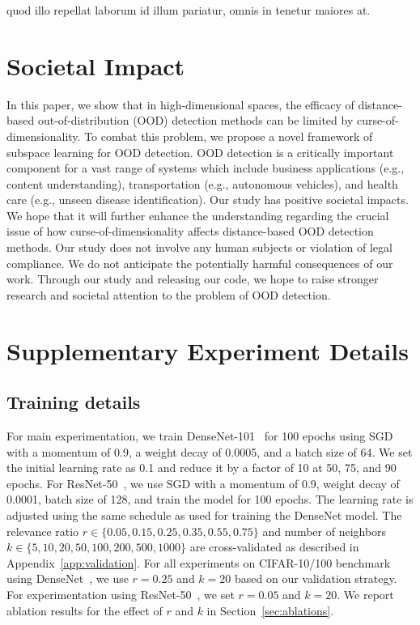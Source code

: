 \documentclass[letterpaper]{article} %
\theoremstyle{plain}
\theoremstyle{definition}
\theoremstyle{remark}
\begin{document}
quod illo repellat laborum id illum pariatur, omnis in tenetur maiores at.\clearpage

\clearpage

\appendix
\section{Societal Impact}
\label{sec:impact}
In this paper, we show that in high-dimensional spaces, the efficacy of distance-based out-of-distribution (OOD) detection methods can be limited by curse-of-dimensionality. To combat this problem, we propose a novel framework of subspace learning for OOD detection. OOD detection is a critically important component for a vast range of systems which include
business applications (e.g., content understanding), transportation (e.g., autonomous vehicles), and health care (e.g., unseen disease identification). Our study has positive societal impacts. We hope that it will further enhance the understanding regarding the crucial issue of how curse-of-dimensionality affects distance-based OOD detection methods. Our study does not involve any human subjects or violation of legal compliance. We do not anticipate the potentially harmful consequences of our work. Through our study and releasing our code, we hope to raise stronger research and societal attention to the problem of OOD detection.




\section{Supplementary Experiment Details}
\label{app:experimental_details}
 \subsection{Training details}
\label{app:train_details}
For main experimentation, we train DenseNet-101~\cite{huang2018densely} for 100 epochs using SGD with a momentum of 0.9, a weight decay of 0.0005, and a batch size of 64. We set the
initial learning rate as 0.1 and reduce it by a factor of 10 at 50, 75, and 90 epochs. For ResNet-50~\cite{he2016deep}, we use SGD with a momentum of 0.9, weight decay of 0.0001, batch size of 128, and train the model for 100 epochs. The learning rate is adjusted using the same schedule as used for training the DenseNet model.
The relevance ratio $r \in \{0.05, 0.15, 0.25, 0.35, 0.55, 0.75\}$ and number of neighbors $k \in \{5,10,20,50,100,200,500,1000\}$ are cross-validated as described in Appendix~\ref{app:validation}. For all experiments on CIFAR-10/100 benchmark using DenseNet~\cite{huang2018densely}, we use $r=0.25$ and $k=20$ based on our validation strategy. For experimentation using ResNet-50~\cite{he2016deep}, we set $r=0.05$ and $k=20$. We report ablation results for the effect of $r$ and $k$ in Section~\ref{sec:ablations}.
\end{document}
